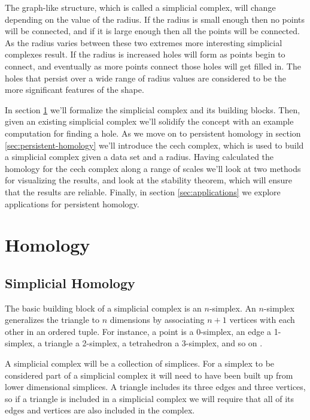 The graph-like structure, which is called a simplicial complex, will change depending on the value of the radius.
If the radius is small enough then no points will be connected, and if it is large enough then all the points will be connected.
As the radius varies between these two extremes more interesting simplicial complexes result.
If the radius is increased holes will form as points begin to connect, and eventually as more points connect those holes will get filled in.
The holes that persist over a wide range of radius values are considered to be the more significant features of the shape.

In section \ref{sec:homology} we'll formalize the simplicial complex and its building blocks.
Then, given an existing simplicial complex we'll solidify the concept with an example computation for finding a hole.
As we move on to persistent homology in section \ref{sec:persistent-homology} we'll introduce the cech complex, which is used to build a simplicial complex given a data set and a radius.
Having calculated the homology for the cech complex along a range of scales we'll look at two methods for visualizing the results, and  look at the stability theorem, which will ensure that the results are reliable.
Finally, in section \ref{sec:applications} we  explore applications for persistent homology.

\section{Homology}\label{sec:homology}

\subsection{Simplicial Homology}\label{sec:simplicial-homology}

The basic building block of a simplicial complex is an \(n\)-simplex.
An \(n\)-simplex generalizes the triangle to \(n\) dimensions by associating \(n+1\) vertices with each other in an ordered tuple.
For instance, a point is a 0-simplex, an edge a 1-simplex, a triangle a 2-simplex, a tetrahedron a 3-simplex, and so on .

\begin{figure}
    
    \caption{}
    \label{fig:basic-simplices}
\end{figure}

A simplicial complex will be a collection of simplices.
For a simplex to be considered part of a simplicial complex it will need to have been built up from lower dimensional simplices.
A triangle includes its three edges and three vertices, so if a triangle is included in a simplicial complex we will require that all of its edges and vertices are also included in the complex.

